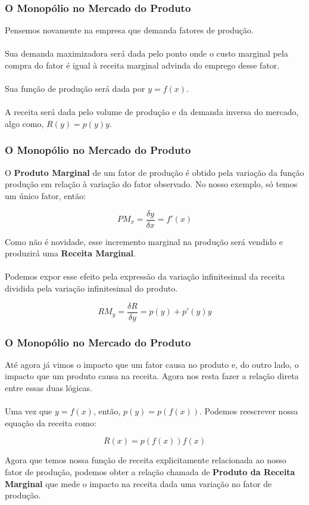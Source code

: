 \documentclass{beamer}[10]
\begin{document}
\begin{frame}
	\frametitle{O Monopólio no Mercado do Produto}

	Pensemos novamente na empresa que demanda fatores de produção. 
	\\~\\
	Sua demanda maximizadora será dada pelo ponto onde o custo marginal pela compra do fator é igual à receita marginal advinda do emprego desse fator.
	\\~\\
	Sua função de produção será dada por $y = f(x)$. 
	\\~\\
	A receita será dada pelo volume de produção e da demanda inversa do mercado, algo como, $R(y) = p(y)y$. 

\end{frame}

\begin{frame}
	\frametitle{O Monopólio no Mercado do Produto}
	
	O \textbf{Produto Marginal} de um fator de produção é obtido pela variação da função produção em relação à variação do fator observado. No nosso exemplo, só temos um único fator, então:

	$$ PM_x = \frac{\delta y}{\delta x} = f'(x) $$

	Como não é novidade, esse incremento marginal na produção será vendido e produzirá uma \textbf{Receita Marginal}. 
	\\~\\
	Podemos expor esse efeito pela expressão da  variação infinitesimal da receita dividida pela variação infinitesimal do produto.

	$$ RM_y = \frac{\delta R}{\delta y} = p(y) + p'(y)y $$

\end{frame}

\begin{frame}
	\frametitle{O Monopólio no Mercado do Produto}
	
	Até agora já vimos o impacto que um fator causa no produto e, do outro lado, o impacto que um produto causa na receita. Agora nos resta fazer a relação direta entre essas duas lógicas.
	\\~\\
	Uma vez que $y = f(x)$, então, $p(y) = p(f(x))$. Podemos reescrever nossa equação da receita como:

	$$ R(x) = p(f(x))f(x) $$

	Agora que temos nossa função de receita explicitamente relacionada ao nosso fator de produção, podemos obter a relação chamada de \textbf{Produto da Receita Marginal} que mede o impacto na receita dada uma variação no fator de produção.

\end{frame}
\end{document}
